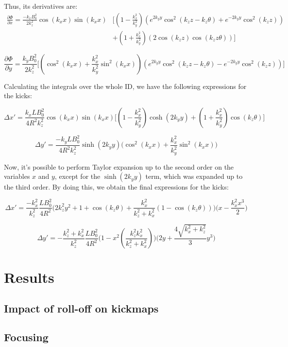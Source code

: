 \documentclass{article}
\begin{document}
Thus, its derivatives are:
\begin{equation}
\begin{split}
\frac{\partial\Phi}{\partial x} = \frac{-k_xB_0^2}{2k_z^2}\cos(k_xx)\sin(k_xx) & \bigg[\left(1-\frac{k_x^2}{k_y^2}\right)\left(e^{2k_yy}\cos^2(k_zz-k_z\theta) + e^{-2k_yy}\cos^2(k_zz)\right) \\
 & + \left(1+\frac{k_x^2}{k_y^2}\right)\left(2\cos(k_zz)\cos(k_zz\theta)\right)\bigg]
\end{split}
\end{equation}

\begin{equation}
\frac{\partial\Phi}{\partial y} = \frac{k_yB_0^2}{2k_z^2}\bigg[\left(\cos^2(k_xx)+\frac{k_x^2}{k_y^2}\sin^2(k_xx)\right)\left(e^{2k_yy}\cos^2(k_zz-k_z\theta) - e^{-2k_yy}\cos^2(k_zz)\right)\bigg]
\end{equation}
 
Calculating the integrals over the whole ID, we have the following expressions for the kicks:

\begin{equation}
\Delta x' = \frac{k_xLB_0^2}{4R^2k_z^2}\cos(k_xx)\sin(k_xx)\bigg[\left(1-\frac{k_x^2}{k_y^2}\right)\cosh(2k_yy) + \left(1+\frac{k_x^2}{k_y^2}\right)\cos(k_z\theta) \bigg]
\end{equation}


\begin{equation}
\Delta y' = \frac{-k_yLB_0^2}{4R^2k_z^2}\sinh(2k_yy)\bigg(\cos^2(k_xx)+\frac{k_x^2}{k_y^2}\sin^2(k_xx)\bigg)
\end{equation}


Now, it's possible to perform Taylor expansion up to the second order on the variables $x$ and $y$, except for the $\sinh(2k_yy)$ term, which was expanded up to the third order. By doing this, we obtain the final expressions for the kicks:

\begin{equation}
\Delta x' = \frac{-k_x^2}{k_z^2}\frac{LB_0^2}{4R^2}\bigg(2k_z^2y^2+1+\cos(k_z\theta)+\frac{k_x^2}{k_z^2+k_x^2}\left(1-\cos(k_z\theta)\right)\bigg)\bigg(x-\frac{k_x^2x^3}{2}\bigg)
\end{equation}

\begin{equation}
\Delta y' = -\frac{k_z^2+k_x^2}{k_z^2}\frac{LB_0^2}{4R^2}\bigg(1-x^2\left(\frac{k_z^2k_x^2}{k_z^2+k_x^2}\right)\bigg)\bigg(2y +\frac{4\sqrt{k_x^2+k_z^2}}{3}y^3\bigg)
\end{equation}

\section{Results}
\subsection{Impact of roll-off on kickmaps}

\subsection{Focusing}
\end{document}
